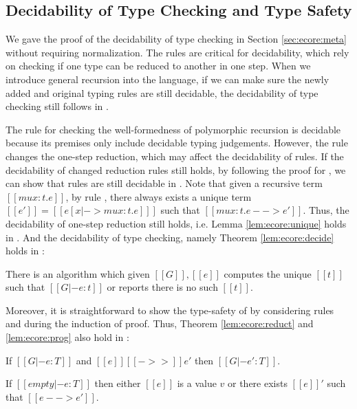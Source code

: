 \subsection{Decidability of Type Checking and Type Safety}\label{sec:rec:meta}
We gave the proof of the decidability of type checking \ecore in
Section \ref{sec:ecore:meta} without requiring normalization. The
\cast rules are critical for decidability, which rely on checking if
one type can be reduced to another in one step. When we introduce
general recursion into the language, if we can make sure the newly
added and original typing rules are still decidable, the decidability
of type checking still follows in \name.

The rule  for checking the well-formedness of
polymorphic recursion is decidable because its premises only include
decidable typing judgements. However, the rule  changes
the one-step reduction, which may affect the decidability of \cast
rules. If the decidability of changed reduction rules still holds, by
following the proof for \ecore, we can show that \cast
rules are still decidable in \name. Note that given a recursive term
$[[mu x:t.e]]$, by rule , there always exists a unique
term $[[e']]=[[e[x|->mu x:t.e] ]]$ such that $[[mu x:t.e -->
    e']]$. Thus, the decidability of one-step reduction still holds,
i.e. Lemma \ref{lem:ecore:unique} holds in \name. And the decidability
of type checking, namely Theorem \ref{lem:ecore:decide} holds in \name:

\begin{thm}\label{lem:rec:decide}
	There is an algorithm which given $[[G]], [[e]]$ computes the
        unique $[[t]]$ such that $[[G |- e:t]]$ or reports there is no
        such $[[t]]$.
\end{thm}

Moreover, it is straightforward to show the type-safety of \name by
considering rules  and  during the
induction of proof. Thus, Theorem \ref{lem:ecore:reduct} and
\ref{lem:ecore:prog} also hold in \name:

\begin{thm}\label{lem:rec:reduct}
If $[[G |- e:T]]$ and $[[e]] [[->>]] e'$ then $[[G |- e':T]]$.
\end{thm}

\begin{thm}[Progress]\label{lem:rec:prog}
If $[[empty |- e:T]]$ then either $[[e]]$ is a value $v$ or there
exists $[[e]]'$ such that $[[e --> e']]$.
\end{thm}
